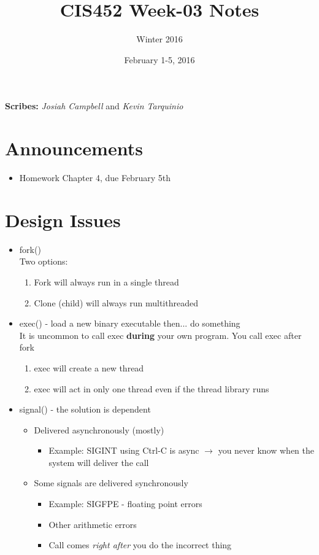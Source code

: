 \documentclass[11pt]{article}
\title{CIS452 Week-03 Notes}
\author{Winter 2016}
\date{February 1-5, 2016}
\begin{document}
\maketitle

\noindent
\textbf{Scribes:} \textit{Josiah Campbell} and \textit{Kevin Tarquinio}

\section*{Announcements}
\begin{itemize}
  \item Homework Chapter 4, due February 5th
\end{itemize}

\section*{Design Issues}
\begin{itemize}
\item fork()
  \\Two options:
  \begin{enumerate}
  \item Fork will always run in a single thread
  \item Clone (child) will always run multithreaded
  \end{enumerate}
\item exec() - load a new binary executable then... do something\\
  It is uncommon to call exec \textbf{during} your own program. You call exec
  after fork
  \begin{enumerate}
  \item exec will create a new thread
  \item exec will act in only one thread even if the thread library runs
  \end{enumerate}
\item signal() - the solution is dependent
  \begin{itemize}
      \item Delivered asynchronously (mostly)
      \begin{itemize}
          \item Example: SIGINT using Ctrl-C is async $\rightarrow$ you never
          know when the system will deliver the call
      \end{itemize}
      \item Some signals are delivered synchronously
      \begin{itemize}
          \item Example: SIGFPE - floating point errors
          \item Other arithmetic errors
          \item Call comes \textit{right after} you do the incorrect thing
      \end{itemize}
  \end{itemize}
\end{itemize}
\end{document}
